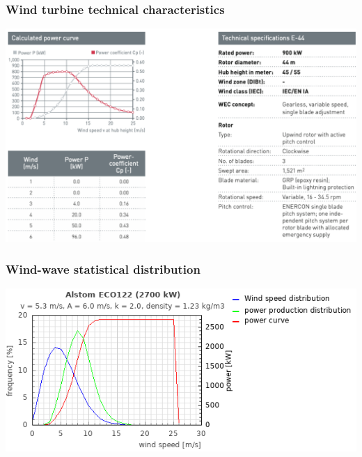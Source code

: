 \documentclass{article}
\begin{document}
\subsubsection{Wind turbine technical characteristics}
\begin{center}
    \includegraphics[width=\textwidth]{media/tech_char.png}
\end{center}

\subsubsection{Wind-wave statistical distribution}
\begin{center}
    \includegraphics[width=\textwidth]{media/c_powercalc.inc.png}
\end{center}


\end{document}

